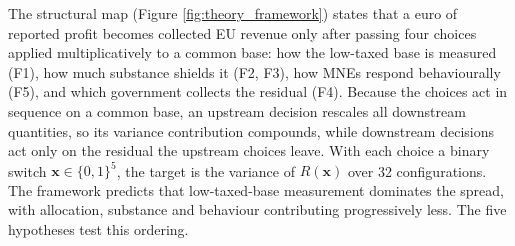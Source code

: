 \documentclass[11pt,a4paper]{article}
\begin{document}
The structural map (Figure \ref{fig:theory_framework}) states that a euro of reported profit becomes collected EU revenue only after passing four choices applied multiplicatively to a common base: how the low-taxed base is measured (F1), how much substance shields it (F2, F3), how MNEs respond behaviourally (F5), and which government collects the residual (F4). Because the choices act in sequence on a common base, an upstream decision rescales all downstream quantities, so its variance contribution compounds, while downstream decisions act only on the residual the upstream choices leave. With each choice a binary switch $\mathbf{x}\in\{0,1\}^5$, the target is the variance of $R(\mathbf{x})$ over 32 configurations. The framework predicts that low-taxed-base measurement dominates the spread, with allocation, substance and behaviour contributing progressively less. The five hypotheses test this ordering.
\end{document}
